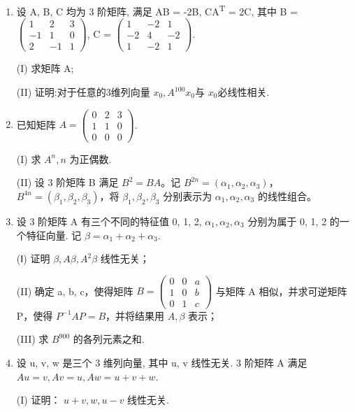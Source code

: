 \documentclass[12pt, a4paper]{ctexart}
\begin{document}
\begin{enumerate}[start=13]
    \item 设 A, B, C 均为 3 阶矩阵, 满足 AB = -2B, CA\textsuperscript{T} = 2C, 其中 B = $ \begin{pmatrix} 1 & 2 & 3 \\ -1 & 1 & 0 \\ 2 & -1 & 1 \end{pmatrix} $, C = $ \begin{pmatrix} 1 & -2 & 1 \\ -2 & 4 & -2 \\ 1 & -2 & 1 \end{pmatrix} $.
    
    (I) 求矩阵 A;
    
    (II) 证明:对于任意的3维列向量 $ x_{0},A^{100}x_{0} $与 $ x_{0} $必线性相关.

    \item 已知矩阵 $ A=\begin{pmatrix}0&2&3\\1&1&0\\0&0&0\end{pmatrix} $.
    
    (I) 求 $ A^{n}, n $ 为正偶数.
    
    (II) 设 3 阶矩阵 B 满足 $ B^2 = BA $。记 $ B^{2n} = (\alpha_1, \alpha_2, \alpha_3) $， $ B^{4n} = (\beta_1, \beta_2, \beta_3) $，将 $ \beta_1, \beta_2, \beta_3 $ 分别表示为 $ \alpha_1, \alpha_2, \alpha_3 $ 的线性组合。

    \item 设 3 阶矩阵 A 有三个不同的特征值 0, 1, 2, $ \alpha_{1}, \alpha_{2}, \alpha_{3} $ 分别为属于 0, 1, 2 的一个特征向量. 记 $ \beta = \alpha_{1} + \alpha_{2} + \alpha_{3} $.
    
    (Ⅰ) 证明 $ \beta, A\beta, A^{2}\beta $ 线性无关；
    
    (II) 确定 a, b, c，使得矩阵 $ B = \begin{pmatrix} 0 & 0 & a \\ 1 & 0 & b \\ 0 & 1 & c \end{pmatrix} $ 与矩阵 A 相似，并求可逆矩阵 P，使得 $ P^{-1}AP = B $，并将结果用 $ A, \beta $ 表示；
    
    (III) 求 $ B^{900} $ 的各列元素之和.

    \item 设 u, v, w 是三个 3 维列向量, 其中 u, v 线性无关. 3 阶矩阵 A 满足 $ Au = v, Av = u, Aw = u + v + w $.
    
    (I) 证明： $ u + v, w, u - v $ 线性无关.
    

\end{enumerate}
\end{document}
